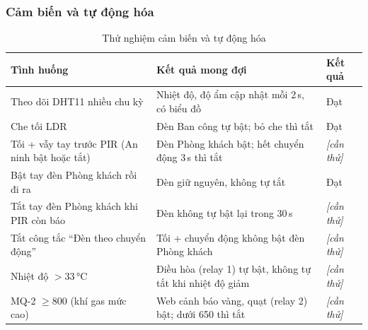 \documentclass[12pt,a4paper]{extarticle}
\newcommand{\hang}{}  %
\begin{document}
\subsubsection{Cảm biến và tự động hóa}
\begin{table}[H]
\centering
\begin{tabularx}{\linewidth}{|P{4.4cm}|L|>{\centering\arraybackslash}p{1.8cm}|}
\hline
\hang \textbf{Tình huống} & \textbf{Kết quả mong đợi} & \textbf{Kết quả} \\ \hline
Theo dõi DHT11 nhiều chu kỳ & Nhiệt độ, độ ẩm cập nhật mỗi 2\,s, có biểu đồ & Đạt \\ \hline
Che tối LDR & Đèn Ban công tự bật; bỏ che thì tắt & Đạt \\ \hline
Tối + vẫy tay trước PIR (An ninh bật hoặc tắt) & Đèn Phòng khách bật; hết chuyển động 3\,s thì tắt & \textit{[cần thử]} \\ \hline
Bật tay đèn Phòng khách rồi đi ra & Đèn giữ nguyên, không tự tắt & Đạt \\ \hline
Tắt tay đèn Phòng khách khi PIR còn báo & Đèn không tự bật lại trong 30\,s & \textit{[cần thử]} \\ \hline
Tắt công tắc ``Đèn theo chuyển động'' & Tối + chuyển động không bật đèn Phòng khách & \textit{[cần thử]} \\ \hline
Nhiệt độ $> 33$\,°C & Điều hòa (relay 1) tự bật, không tự tắt khi nhiệt độ giảm & \textit{[cần thử]} \\ \hline
MQ-2 $\ge 800$ (khí gas mức cao) & Web cảnh báo vàng, quạt (relay 2) bật; dưới 650 thì tắt & \textit{[cần thử]} \\ \hline
\end{tabularx}
\caption{Thử nghiệm cảm biến và tự động hóa}
\label{tab:tn-tudong}
\end{table}
\end{document}

